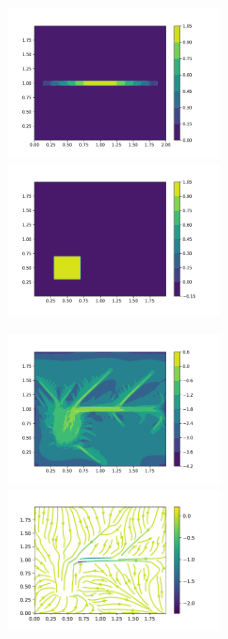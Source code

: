 \documentclass{article}
\theoremstyle{plain}
\theoremstyle{remark}
\theoremstyle{remark}
\theoremstyle{remark}
\numberwithin{equation}{section}
\begin{document}
\begin{figure}
  \includegraphics[width=0.5\textwidth]{6/m1}
  \includegraphics[width=0.5\textwidth]{6/s}
\end{figure}
\begin{figure}
  \includegraphics[width=0.5\textwidth]{6/PCG}
  \includegraphics[width=0.5\textwidth]{6/vector}
\end{figure}
\end{document}
